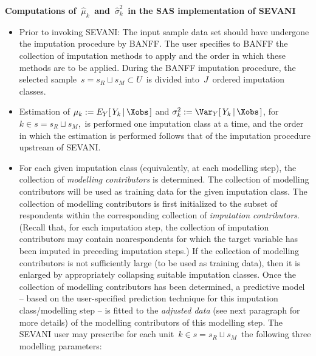 \vskip 0.5cm
\noindent
\textbf{Computations of
\,$\widehat{\mu}_{k}$\,
and
\,$\widehat{\sigma}_{k}^{2}$\,
in the SAS implementation of SEVANI}
\begin{itemize}
\item
    Prior to invoking SEVANI:
    \vskip 0.01cm
    \noindent
    The input sample data set should have undergone the imputation procedure by BANFF.
    The user specifies to BANFF the collection of imputation methods to apply and
    the order in which these methods are to be applied.
    During the BANFF imputation procedure, the selected sample
    \,$s = s_{R} \sqcup s_{M} \subset U$\,
    is divided into \,$J$\, ordered imputation classes.
\item
    Estimation of
    \;$\mu_{k} := E_{Y}\!\left[\,Y_{k}\left\vert\,\Xobs\right.\right]$\;
    and
    \;$\sigma_{k}^{2} := \Var_{Y}\!\left[\,Y_{k}\left\vert\,\Xobs\right.\right]$,\;
    for \,$k \in s = s_{R} \sqcup s_{M}$,\,
    is performed one imputation class at a time, and the order
    in which the estimation is performed follows that of the 
    imputation procedure upstream of SEVANI.
\item
    For each given imputation class (equivalently, at each modelling step),
    the collection of \textit{modelling contributors} is determined.
    The collection of modelling contributors will be used as training data
    for the given imputation class.
    \vskip 0.01cm
    \noindent
    The collection of modelling contributors is first initialized to the subset of respondents
    within the corresponding collection of \textit{imputation contributors}.
    (Recall that, for each imputation step, the collection of imputation contributors
    may contain nonrespondents for which the target variable has been imputed in preceding imputation steps.)
    If the collection of modelling contributors is not sufficiently large
    (to be used as training data), then it is enlarged by appropriately collapsing suitable imputation classes.
    \vskip 0.01cm
    \noindent
    Once the collection of modelling contributors has been determined,
    a predictive model
    -- based on the user-specified prediction technique for this imputation class/modelling step --
    is fitted to the \textit{adjusted data} (see next paragraph for more details)
    of the modelling contributors of this modelling step. 
    \vskip 0.01cm
    \noindent
    The SEVANI user may prescribe for each unit
    \,$k \in s = s_{R} \sqcup s_{M}$\,
    the following three modelling parameters:
    \begin{itemize}

\end{itemize}
\end{itemize}
